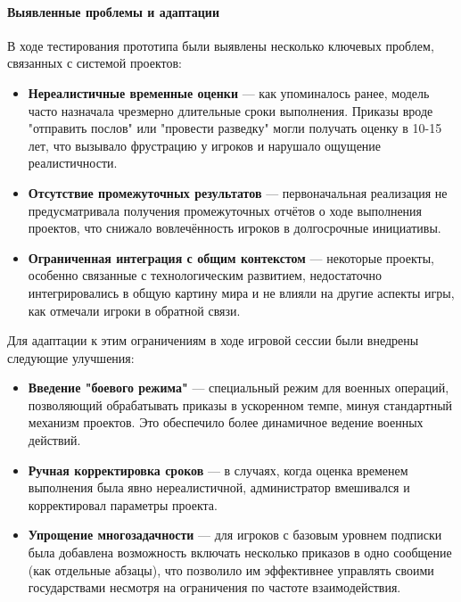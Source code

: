 \paragraph{Выявленные проблемы и адаптации}

В ходе тестирования прототипа были выявлены несколько ключевых проблем, связанных с системой проектов:

\begin{itemize}
    \item \textbf{Нереалистичные временные оценки} — как упоминалось ранее, модель часто назначала чрезмерно длительные сроки выполнения. Приказы вроде "{}отправить послов"{} или "{}провести разведку"{} могли получать оценку в 10-15 лет, что вызывало фрустрацию у игроков и нарушало ощущение реалистичности.

    \item \textbf{Отсутствие промежуточных результатов} — первоначальная реализация не предусматривала получения промежуточных отчётов о ходе выполнения проектов, что снижало вовлечённость игроков в долгосрочные инициативы.

    \item \textbf{Ограниченная интеграция с общим контекстом} — некоторые проекты, особенно связанные с технологическим развитием, недостаточно интегрировались в общую картину мира и не влияли на другие аспекты игры, как отмечали игроки в обратной связи.
\end{itemize}

Для адаптации к этим ограничениям в ходе игровой сессии были внедрены следующие улучшения:

\begin{itemize}
    \item \textbf{Введение "{}боевого режима"{}} — специальный режим для военных операций, позволяющий обрабатывать приказы в ускоренном темпе, минуя стандартный механизм проектов. Это обеспечило более динамичное ведение военных действий.

    \item \textbf{Ручная корректировка сроков} — в случаях, когда оценка временем выполнения была явно нереалистичной, администратор вмешивался и корректировал параметры проекта.

    \item \textbf{Упрощение многозадачности} — для игроков с базовым уровнем подписки была добавлена возможность включать несколько приказов в одно сообщение (как отдельные абзацы), что позволило им эффективнее управлять своими государствами несмотря на ограничения по частоте взаимодействия.
\end{itemize}

